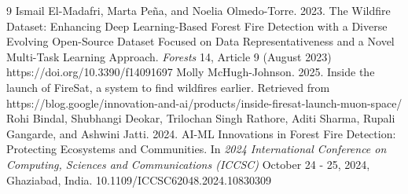 \documentclass[sigconf]{acmart}
\begin{document}

\begin{thebibliography}{9}
Ismail El-Madafri, Marta Peña, and Noelia Olmedo-Torre. 2023. The Wildfire Dataset: Enhancing Deep Learning-Based Forest Fire Detection with a Diverse Evolving Open-Source Dataset Focused on Data Representativeness and a Novel Multi-Task Learning Approach. \emph{Forests} 14, Article 9 (August 2023) https://doi.org/10.3390/f14091697
Molly McHugh-Johnson. 2025. Inside the launch of FireSat, a system to find wildfires earlier. Retrieved from https://blog.google/innovation-and-ai/products/inside-firesat-launch-muon-space/
Rohi Bindal, Shubhangi Deokar, Trilochan Singh Rathore, Aditi Sharma, Rupali Gangarde, and Ashwini Jatti. 2024. AI-ML Innovations in Forest Fire Detection: Protecting Ecosystems and Communities. In \emph{2024 International Conference on Computing, Sciences and Communications (ICCSC)} October 24 - 25, 2024, Ghaziabad, India. 10.1109/ICCSC62048.2024.10830309
\end{thebibliography}
\end{document}
